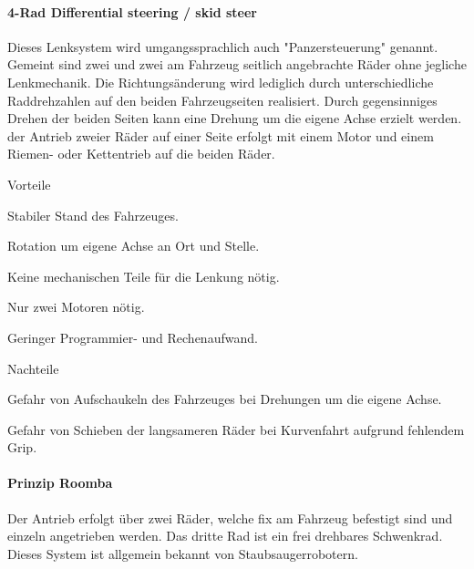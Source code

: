 \documentclass[../main.tex]{subfiles}
\begin{document}
\paragraph{4-Rad Differential steering / skid steer}
Dieses Lenksystem wird umgangssprachlich auch "Panzersteuerung" genannt. Gemeint sind zwei und zwei am Fahrzeug seitlich angebrachte Räder ohne jegliche Lenkmechanik. Die Richtungsänderung wird lediglich durch unterschiedliche Raddrehzahlen auf den beiden Fahrzeugseiten realisiert. Durch gegensinniges Drehen der beiden Seiten kann eine Drehung um die eigene Achse erzielt werden. der Antrieb zweier Räder auf einer Seite erfolgt mit einem Motor und einem Riemen- oder Kettentrieb auf die beiden Räder.

\begin{minipage}[t]{0.48\textwidth}
    \begin{items}
        \item[Vorteile]
        \item Stabiler Stand des Fahrzeuges.
        \item Rotation um eigene Achse an Ort und Stelle.
        \item Keine mechanischen Teile für die Lenkung nötig.
        \item Nur zwei Motoren nötig.
        \item Geringer Programmier- und Rechenaufwand.
    \end{items}
\end{minipage}
\begin{minipage}[t]{0.48\textwidth}
    \begin{items}
      \item [Nachteile]
       \item Gefahr von Aufschaukeln des Fahrzeuges bei Drehungen um die eigene Achse.
      \item Gefahr von Schieben der langsameren Räder bei Kurvenfahrt aufgrund fehlendem Grip.
    \end{items}
\end{minipage}

\paragraph{Prinzip Roomba} \label{recherche-prinzip-roomba}
Der Antrieb erfolgt über zwei Räder, welche fix am Fahrzeug befestigt sind und einzeln angetrieben werden. Das dritte Rad ist ein frei drehbares Schwenkrad. Dieses System ist allgemein bekannt von Staubsaugerrobotern.
\end{document}
